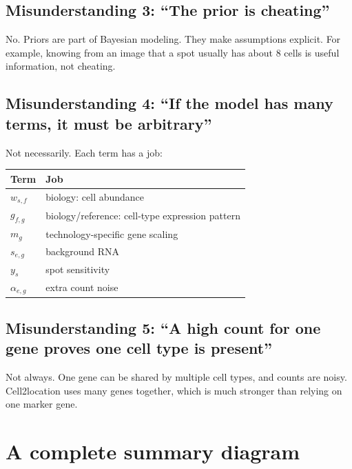 \documentclass[11pt]{article}
\begin{document}
\subsection{Misunderstanding 3: ``The prior is cheating''}

No. Priors are part of Bayesian modeling. They make assumptions explicit. For example, knowing from an image that a spot usually has about 8 cells is useful information, not cheating.

\subsection{Misunderstanding 4: ``If the model has many terms, it must be arbitrary''}

Not necessarily. Each term has a job:

\begin{center}
\begin{tabular}{ll}
\toprule
Term & Job \\
\midrule
$w_{s,f}$ & biology: cell abundance \\
$g_{f,g}$ & biology/reference: cell-type expression pattern \\
$m_g$ & technology-specific gene scaling \\
$s_{e,g}$ & background RNA \\
$y_s$ & spot sensitivity \\
$\alpha_{e,g}$ & extra count noise \\
\bottomrule
\end{tabular}
\end{center}

\subsection{Misunderstanding 5: ``A high count for one gene proves one cell type is present''}

Not always. One gene can be shared by multiple cell types, and counts are noisy. Cell2location uses many genes together, which is much stronger than relying on one marker gene.

\section{A complete summary diagram}
\end{document}
